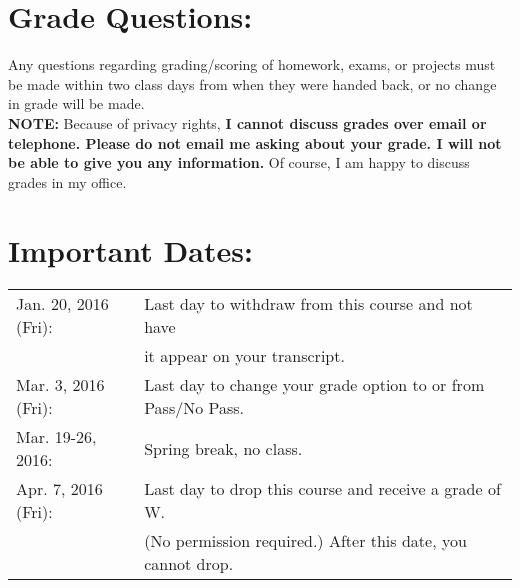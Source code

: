 \documentclass[margin]{res}
\theoremstyle{plain}
\theoremstyle{definition}
\theoremstyle{remark}
\begin{document}
\begin{resume}

\section{Grade Questions:} 
Any questions regarding grading/scoring of homework, exams, or projects must be made within two class days from when they were handed back, or no change in grade will be made.  
\\\textbf{NOTE:} Because of privacy rights, \textbf{I cannot discuss grades over email or telephone. Please do not email me asking about your grade.  I will not be able to give you any information.}  Of course, I am happy to discuss grades in my office.

\section{Important Dates:}
\begin{tabular}{ll}
Jan. 20, 2016 (Fri): & Last day to withdraw from this course and not have\\& it appear on your transcript.\\

Mar. 3, 2016 (Fri): & Last day to change your grade option to or from Pass/No Pass.\\
    
Mar. 19-26, 2016:   & Spring break, no class.\\
Apr. 7, 2016 (Fri): &  Last day to drop this course and receive a grade of W. \\&
     (No permission required.) After this date, you cannot drop.
  \end{tabular}


\end{resume}
\end{document}
